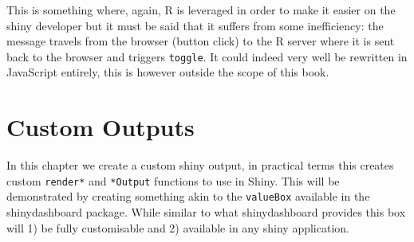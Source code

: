 \documentclass[
]{krantz}
\makeatletter
\newenvironment{Shaded}{\begin{snugshade}}{\end{snugshade}}
\newcommand{\ControlFlowTok}[1]{\textcolor[rgb]{0.27,0.27,0.27}{\textbf{#1}}}
\newcommand{\DataTypeTok}[1]{\textcolor[rgb]{0.27,0.27,0.27}{#1}}
\newcommand{\KeywordTok}[1]{\textcolor[rgb]{0.27,0.27,0.27}{\textbf{#1}}}
\newcommand{\NormalTok}[1]{#1}
\newcommand{\OperatorTok}[1]{\textcolor[rgb]{0.43,0.43,0.43}{\textbf{#1}}}
\newcommand{\StringTok}[1]{\textcolor[rgb]{0.5,0.5,0.5}{#1}}
\newenvironment{kframe}{%
\medskip{}
\setlength{\fboxsep}{.8em}
 \def\at@end@of@kframe{}%
 \ifinner\ifhmode%
  \def\at@end@of@kframe{\end{minipage}}%
  \begin{minipage}{\columnwidth}%
 \fi\fi%
 \def\FrameCommand##1{\hskip\@totalleftmargin \hskip-\fboxsep
 \colorbox{shadecolor}{##1}\hskip-\fboxsep
     \hskip-\linewidth \hskip-\@totalleftmargin \hskip\columnwidth}%
 \MakeFramed {\advance\hsize-\width
   \@totalleftmargin\z@ \linewidth\hsize
   \@setminipage}}%
 {\par\unskip\endMakeFramed%
 \at@end@of@kframe}
\renewenvironment{Shaded}{\begin{kframe}}{\end{kframe}}
\makeatother
\begin{document}
\begin{Shaded}
\end{Shaded}

This is something where, again, R is leveraged in order to make it easier on the shiny developer but it must be said that it suffers from some inefficiency: the message travels from the browser (button click) to the R server where it is sent back to the browser and triggers \texttt{toggle}. It could indeed very well be rewritten in JavaScript entirely, this is however outside the scope of this book.

\hypertarget{custom-outputs}{%
\chapter{Custom Outputs}\label{custom-outputs}}

In this chapter we create a custom shiny output, in practical terms this creates custom \texttt{render*} and \texttt{*Output} functions to use in Shiny. This will be demonstrated by creating something akin to the \texttt{valueBox} available in the shinydashboard \citep{R-shinydashboard} package. While similar to what shinydashboard provides this box will 1) be fully customisable and 2) available in any shiny application.
\end{document}
